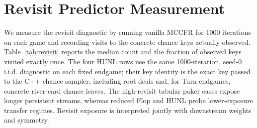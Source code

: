 \documentclass[11pt]{article}
\begin{document}
\section{Revisit Predictor Measurement}
\label{app:revisit-protocol}

We measure the revisit diagnostic by running vanilla MCCFR for 1000 iterations on each game and recording visits to the concrete chance keys actually observed. Table~\ref{tab:revisit} reports the median count and the fraction of observed keys visited exactly once. The four HUNL rows use the same 1000-iteration, seed-0 i.i.d. diagnostic on each fixed endgame; their key identity is the exact key passed to the C++ chance sampler, including root deals and, for Turn endgames, concrete river-card chance leaves. The high-revisit tabular poker cases expose longer persistent streams, whereas reduced Flop and HUNL probe lower-exposure transfer regimes. Revisit exposure is interpreted jointly with downstream weights and symmetry.
\end{document}
